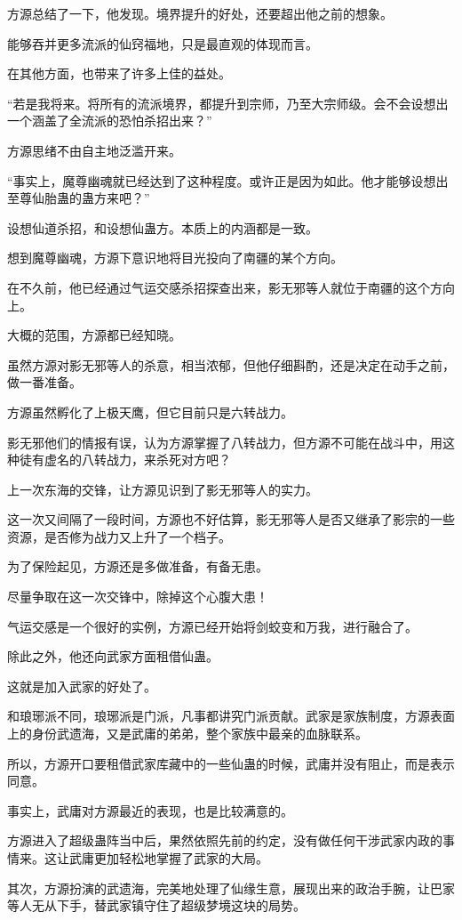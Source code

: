 \begin{this_body}
方源总结了一下，他发现。境界提升的好处，还要超出他之前的想象。

能够吞并更多流派的仙窍福地，只是最直观的体现而言。

在其他方面，也带来了许多上佳的益处。

“若是我将来。将所有的流派境界，都提升到宗师，乃至大宗师级。会不会设想出一个涵盖了全流派的恐怕杀招出来？”

方源思绪不由自主地泛滥开来。

“事实上，魔尊幽魂就已经达到了这种程度。或许正是因为如此。他才能够设想出至尊仙胎蛊的蛊方来吧？”

设想仙道杀招，和设想仙蛊方。本质上的内涵都是一致。

想到魔尊幽魂，方源下意识地将目光投向了南疆的某个方向。

在不久前，他已经通过气运交感杀招探查出来，影无邪等人就位于南疆的这个方向上。

大概的范围，方源都已经知晓。

虽然方源对影无邪等人的杀意，相当浓郁，但他仔细斟酌，还是决定在动手之前，做一番准备。

方源虽然孵化了上极天鹰，但它目前只是六转战力。

影无邪他们的情报有误，认为方源掌握了八转战力，但方源不可能在战斗中，用这种徒有虚名的八转战力，来杀死对方吧？

上一次东海的交锋，让方源见识到了影无邪等人的实力。

这一次又间隔了一段时间，方源也不好估算，影无邪等人是否又继承了影宗的一些资源，是否修为战力又上升了一个档子。

为了保险起见，方源还是多做准备，有备无患。

尽量争取在这一次交锋中，除掉这个心腹大患！

气运交感是一个很好的实例，方源已经开始将剑蛟变和万我，进行融合了。

除此之外，他还向武家方面租借仙蛊。

这就是加入武家的好处了。

和琅琊派不同，琅琊派是门派，凡事都讲究门派贡献。武家是家族制度，方源表面上的身份武遗海，又是武庸的弟弟，整个家族中最亲的血脉联系。

所以，方源开口要租借武家库藏中的一些仙蛊的时候，武庸并没有阻止，而是表示同意。

事实上，武庸对方源最近的表现，也是比较满意的。

方源进入了超级蛊阵当中后，果然依照先前的约定，没有做任何干涉武家内政的事情来。这让武庸更加轻松地掌握了武家的大局。

其次，方源扮演的武遗海，完美地处理了仙缘生意，展现出来的政治手腕，让巴家等人无从下手，替武家镇守住了超级梦境这块的局势。


\end{this_body}
